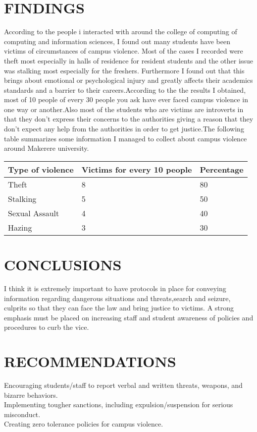 \documentclass[10pt]{article}
\begin{document}
\section{FINDINGS}
{   According to the people i interacted with around the college of computing of computing and information sciences, I found out many students have been victims of circumstances of campus violence. Most of the cases I recorded were theft most especially in halls of residence for resident students and the other issue was stalking most especially for the freshers. Furthermore I found out that this brings about emotional or psychological injury and greatly affects their academics standards and a barrier to their careers.According to the the results I obtained, most of 10 people of every 30 people you ask have ever faced campus violence in one	way or another.Also most of the students who are victims are introverts in that they don't express their concerns to the authorities giving a reason that they don't expect any help from the authorities in order to get justice.The following table summarizes some information I managed to collect about campus violence around Makerere university.
	
\begin{tabularx}{\textwidth}{ |X|X|X| }
	\hline
	Type of violence & Victims for every 10 people & Percentage  \\
	\hline 
	Theft  & 8  & 80    \\
	\hline
	Stalking & 5 & 50   \\
	\hline
	Sexual Assault &  4 & 40  \\
	\hline
	Hazing & 3 & 30  \\
	\hline
\end{tabularx}


}	
\section{CONCLUSIONS}
{I think it is extremely important to have protocols in place for conveying information regarding dangerous situations and threats,search and seizure, culprits so that they can face the law and bring justice to victims. A strong emphasis must be placed on increasing staff and student awareness of policies and procedures to curb the vice.
}
\section{RECOMMENDATIONS}
{Encouraging students/staff to report verbal and written threats, weapons, and bizarre behaviors.\\
	Implementing tougher sanctions, including expulsion/suspension for serious misconduct.\\
	Creating zero tolerance policies for campus violence.
}
\end{document}
